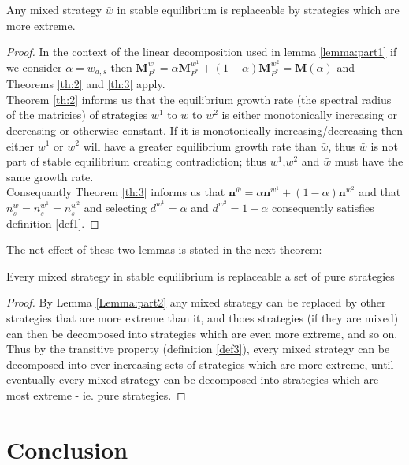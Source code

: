 \begin{Lemma}\label{Lemma:part2}
Any mixed strategy $\bar{w}$ in stable equilibrium is replaceable by strategies which are more extreme.
\end{Lemma}
\begin{proof}
In the context of the linear decomposition used in lemma \ref{lemma:part1} if we consider $\alpha = \bar{w}_{\bar{a},\bar{s}}$ then $\mathbf{M}_{P^*}^{\bar{w}} = \alpha\mathbf{M}_{P^*}^{w^1} + (1-\alpha)\mathbf{M}_{P^*}^{w^2} = \mathbf{M}(\alpha)$ and Theorems \ref{th:2} and \ref{th:3} apply.\\
Theorem \ref{th:2} informs us that the equilibrium growth rate (the spectral radius of the matricies) of strategies $w^1$ to $\bar{w}$ to $w^2$ is either monotonically increasing or decreasing or otherwise constant.
If it is monotonically increasing/decreasing then either $w^1$ or $w^2$ will have a greater equilibrium growth rate than $\bar{w}$, thus $\bar{w}$ is not part of stable equilibrium creating contradiction; thus $w^1$,$w^2$ and $\bar{w}$ must have the same growth rate.\\
Consequantly Theorem \ref{th:3} informs us that $\mathbf{n}^{\bar{w}} = \alpha \mathbf{n}^{w^1} + (1-\alpha)\mathbf{n}^{w^2}$ and that $n^{\bar{w}}_{\bar{s}} = n^{w^1}_{\bar{s}} = n^{w^2}_{\bar{s}}$ and selecting $d^{w^1} = \alpha$ and $d^{w^2} = 1-\alpha$ consequently satisfies definition \ref{def1}.
\end{proof}

The net effect of these two lemmas is stated in the next theorem:

\begin{Theorem}\label{the_proof}
Every mixed strategy in stable equilibrium is replaceable a set of pure strategies 
\end{Theorem}
\begin{proof}
By Lemma \ref{Lemma:part2} any mixed strategy can be replaced by other strategies that are more extreme than it, and thoes strategies (if they are mixed) can then be decomposed into strategies which are even more extreme, and so on.
Thus by the transitive property (definition \ref{def3}), every mixed strategy can be decomposed into ever increasing sets of strategies which are more extreme, until eventually every mixed strategy can be decomposed into strategies which are most extreme - ie. pure strategies.
\end{proof}

\section{Conclusion}

